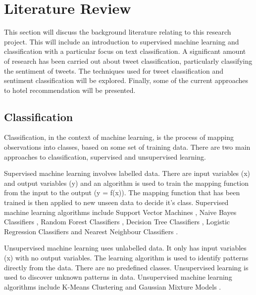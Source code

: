 \chapter{Literature Review}

This section will discuss the background literature relating to this research project. This will include an introduction to supervised machine learning and classification with a particular focus on text classification. A significant amount of research has been carried out about tweet classification, particularly classifying the sentiment of tweets. The techniques used for tweet classification and sentiment classification will be explored. Finally, some of the current approaches to hotel recommendation will be presented.

\section{Classification}

Classification, in the context of machine learning, is the process of mapping observations into classes, based on some set of training data. There are two main approaches to classification, supervised and unsupervised learning. 

Supervised machine learning \cite{supervised2007} involves labelled data. There are input variables (x) and output variables (y) and an algorithm is used to train the mapping function from the input to the output (y = f(x)). The mapping function that has been trained is then applied to new unseen data to decide it's class. Supervised machine learning algorithms include Support Vector Machines \cite{Vapnik1995,Vapnik21995}, Naive Bayes Classifiers \cite{NaiveBayes1998}, Random Forest Classifiers \cite{Breiman2001}, Decision Tree Classifiers \cite{decisionTrees1991}, Logistic Regression Classifiers \cite{logisticRegression2007} and Nearest Neighbour Classifiers \cite{knn2001}. 

Unsupervised machine learning uses unlabelled data. It only has input variables (x) with no output variables. The learning algorithm is used to identify patterns directly from the data. There are no predefined classes. Unsupervised learning is used to discover unknown patterns in data. Unsupervised machine learning algorithms include K-Means Clustering \cite{kmeans2002} and Gaussian Mixture Models \cite{duda1973pattern}. 

